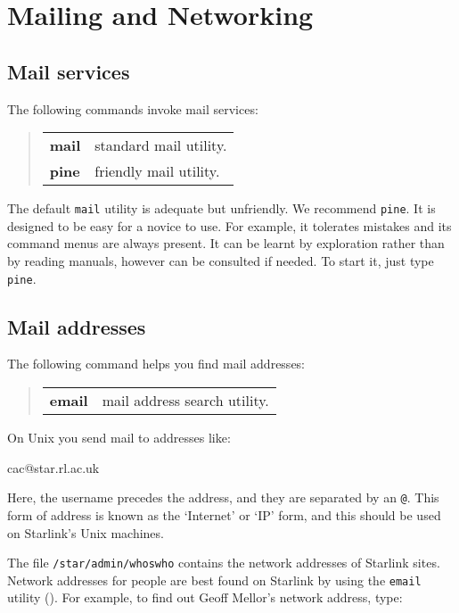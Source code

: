 \documentclass[twoside,11pt,nolof]{starlink}
\begin{document}
\newpage

\section{Mailing and Networking\label{Mail}}

\subsection{Mail services}

The following commands invoke mail services:
\begin{quote}
\begin{tabular}{lp{67mm}}

\textbf{mail}  & standard mail utility.\\
\textbf{pine}  & friendly mail utility.

\end{tabular}
\end{quote}
The default \texttt{mail} utility is adequate but unfriendly.
We recommend \texttt{pine}.
It is designed to be easy for a novice to use.
For example, it tolerates mistakes and its command menus are always present.
It can be learnt by exploration rather than by reading manuals, however
 can be consulted if needed.
To start it, just type \texttt{pine}.

\subsection{Mail addresses}

The following command helps you find mail addresses:
\begin{quote}
\begin{tabular}{lp{67mm}}

\textbf{email}  & mail address search utility.

\end{tabular}
\end{quote}
On Unix you send mail to addresses like:
\begin{terminalv}
cac@star.rl.ac.uk
\end{terminalv}
Here, the username precedes the address, and they are separated
by an \texttt{@}.
This form of address is known as the `Internet' or `IP' form, and this
should be used on Starlink's Unix machines.

The file \texttt{/star/admin/whoswho} contains the network addresses of Starlink
sites.
Network addresses for people are best found on Starlink by using the
\texttt{email} utility
().
For example, to find out Geoff Mellor's network address, type:
\begin{terminalv}
\end{terminalv}
\end{document}
